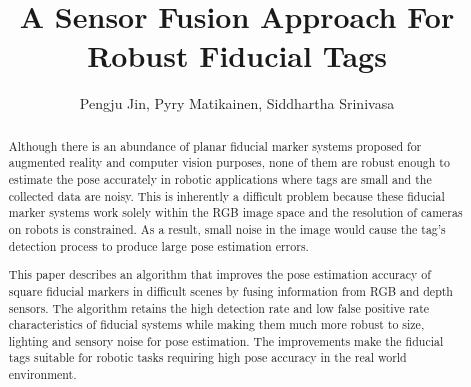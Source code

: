 \documentclass[letterpaper,conference,10pt]{ieeetran}
\begin{document}
\title{\vspace{0.20in}\LARGE A Sensor Fusion Approach For Robust Fiducial Tags}

\author{Pengju Jin, Pyry Matikainen, Siddhartha Srinivasa}
\maketitle 	

\begin{abstract}
Although there is an abundance of planar fiducial marker systems proposed for augmented reality and computer vision purposes, none of them are robust enough to estimate the pose accurately in robotic applications where tags are small and the collected data are noisy. This is inherently a difficult problem because these fiducial marker systems work solely within the RGB image space and the resolution of cameras on robots is constrained. As a result, small noise in the image would cause the tag's detection process to produce large pose estimation errors. 

This paper describes an algorithm that improves the pose estimation accuracy of square fiducial markers in difficult scenes by fusing information from RGB and depth sensors. The algorithm retains the high detection rate and low false  positive rate characteristics of fiducial systems while making them much more robust to size, lighting and sensory noise for pose estimation. The improvements make the fiducial tags suitable for robotic tasks requiring high pose accuracy in the real world environment.
\end{abstract}

\IEEEpeerreviewmaketitle













{\footnotesize

}
\end{document}
